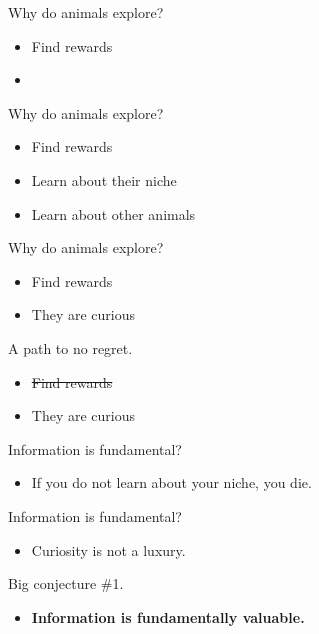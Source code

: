 \documentclass[10pt]{beamer}
\begin{document}
\begin{frame}[fragile]{Why do animals explore?}
\begin{itemize}
    \item Find rewards
    \item 
\end{itemize}
\end{frame}

\begin{frame}[fragile]{Why do animals explore?}
\begin{itemize}
    \item Find rewards
    \item Learn about their niche
    \item Learn about other animals
\end{itemize}
\end{frame}

\begin{frame}[fragile]{Why do animals explore?}
\begin{itemize}
    \item Find rewards
    \item They are curious
\end{itemize}
\end{frame}

\begin{frame}[fragile]{A path to no regret.}
\begin{itemize}
    \item \st{Find rewards}
    \item They are curious
\end{itemize}
\end{frame}

\begin{frame}[fragile]{Information is fundamental?}
\begin{itemize}
    \item If you do not learn about your niche, you die.
\end{itemize}
\end{frame}

\begin{frame}[fragile]{Information is fundamental?}
\begin{itemize}
    \item Curiosity is not a luxury.
\end{itemize}
\end{frame}

\begin{frame}[fragile]{Big conjecture \#1.}
\begin{itemize}
    \item \textbf{Information is fundamentally valuable.}
\end{itemize}
\end{frame}
\end{document}
